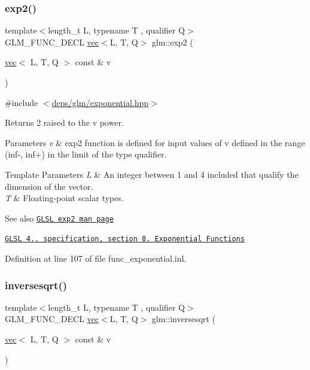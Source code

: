 \subsubsection{\texorpdfstring{exp2()}{exp2()}}
{\footnotesize\ttfamily template$<$length\+\_\+t L, typename T , qualifier Q$>$ \\
G\+L\+M\+\_\+\+F\+U\+N\+C\+\_\+\+D\+E\+CL \hyperlink{structglm_1_1vec}{vec}$<$L, T, Q$>$ glm\+::exp2 (\begin{DoxyParamCaption}\item[{\hyperlink{structglm_1_1vec}{vec}$<$ L, T, Q $>$ const \&}]{v }\end{DoxyParamCaption})}



{\ttfamily \#include $<$\hyperlink{exponential_8hpp}{deps/glm/exponential.\+hpp}$>$}

Returns 2 raised to the v power.


\begin{DoxyParams}{Parameters}
{\em v} & exp2 function is defined for input values of v defined in the range (inf-\/, inf+) in the limit of the type qualifier. \\
\hline
\end{DoxyParams}

\begin{DoxyTemplParams}{Template Parameters}
{\em L} & An integer between 1 and 4 included that qualify the dimension of the vector. \\
\hline
{\em T} & Floating-\/point scalar types.\\
\hline
\end{DoxyTemplParams}
\begin{DoxySeeAlso}{See also}
\href{http://www.opengl.org/sdk/docs/manglsl/xhtml/exp2.xml}{\tt G\+L\+SL exp2 man page} 

\href{http://www.opengl.org/registry/doc/GLSLangSpec.4.20.8.pdf}{\tt G\+L\+SL 4.. specification, section 8. Exponential Functions} 
\end{DoxySeeAlso}


Definition at line 107 of file func\+\_\+exponential.\+inl.

\mbox{\label{group__core__func__exponential_ga523dd6bd0ad9f75ae2d24c8e4b017b7a}} 
\subsubsection{\texorpdfstring{inversesqrt()}{inversesqrt()}}
{\footnotesize\ttfamily template$<$length\+\_\+t L, typename T , qualifier Q$>$ \\
G\+L\+M\+\_\+\+F\+U\+N\+C\+\_\+\+D\+E\+CL \hyperlink{structglm_1_1vec}{vec}$<$L, T, Q$>$ glm\+::inversesqrt (\begin{DoxyParamCaption}\item[{\hyperlink{structglm_1_1vec}{vec}$<$ L, T, Q $>$ const \&}]{v }\end{DoxyParamCaption})}



